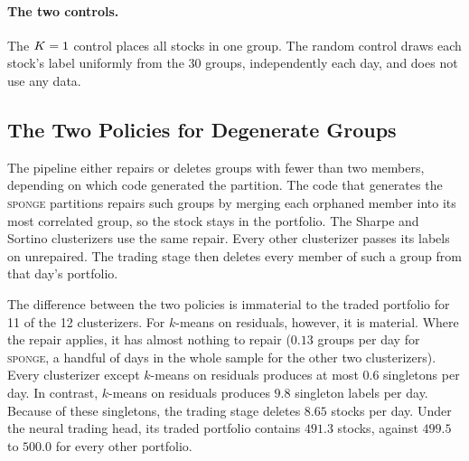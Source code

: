 \paragraph{The two controls.} The $K=1$ control places all stocks in one group.
The random control draws each stock's label uniformly from the 30 groups,
independently each day, and does not use any data.


\subsection{The Two Policies for Degenerate Groups}
\label{app:singleton}

The pipeline either repairs or deletes groups with fewer than two members,
depending on which code generated the partition. The code that generates the \textsc{sponge} partitions repairs such groups by
merging each orphaned member into its most correlated group, so
the stock stays in the portfolio. The Sharpe and Sortino clusterizers use the
same repair. Every other clusterizer passes its labels on unrepaired. The
trading stage then deletes every member of such a group
from that day's portfolio.

The difference between the two policies is immaterial to the traded portfolio for 11 of the 12 clusterizers. For $k$-means on residuals, however, it is material. Where
the repair applies, it has almost nothing to repair ($0.13$
groups per day for \textsc{sponge}, a handful of days in the whole
sample for the other two clusterizers). Every clusterizer except $k$-means on residuals
produces at most $0.6$ singletons per day. In contrast, $k$-means on residuals produces $9.8$ singleton labels per day. Because of these singletons, the trading stage deletes $8.65$ stocks per day. Under the neural trading head, its traded portfolio contains $491.3$ stocks, against $499.5$ to $500.0$ for every other portfolio.

